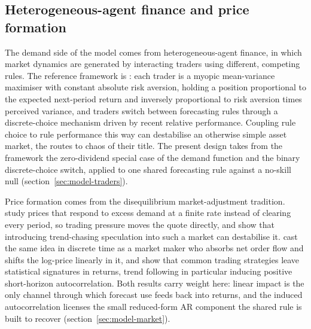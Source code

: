 \documentclass[12pt]{article}
\begin{document}
\subsection{Heterogeneous-agent finance and price formation}

The demand side of the model comes from heterogeneous-agent finance, in which market dynamics are generated by interacting traders using different, competing rules. The reference framework is \citet{brockhommes1998}: each trader is a myopic mean-variance maximiser with constant absolute risk aversion, holding a position proportional to the expected next-period return and inversely proportional to risk aversion times perceived variance, and traders switch between forecasting rules through a discrete-choice mechanism driven by recent relative performance. Coupling rule choice to rule performance this way can destabilise an otherwise simple asset market, the routes to chaos of their title. The present design takes from the framework the zero-dividend special case of the demand function and the binary discrete-choice switch, applied to one shared forecasting rule against a no-skill null (section~\ref{sec:model-traders}). %

Price formation comes from the disequilibrium market-adjustment tradition. \citet{beja1980} study prices that respond to excess demand at a finite rate instead of clearing every period, so trading pressure moves the quote directly, and show that introducing trend-chasing speculation into such a market can destabilise it. \citet{farmerjoshi2002} cast the same idea in discrete time as a market maker who absorbs net order flow and shifts the log-price linearly in it, and show that common trading strategies leave statistical signatures in returns, trend following in particular inducing positive short-horizon autocorrelation. Both results carry weight here: linear impact is the only channel through which forecast use feeds back into returns, and the induced autocorrelation licenses the small reduced-form AR component the shared rule is built to recover (section~\ref{sec:model-market}). %
\end{document}
